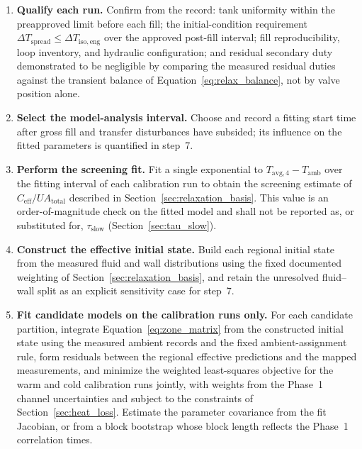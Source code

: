 \documentclass[11pt]{article}
\newcommand{\Tavg}{T_{\mathrm{avg},4}}
\newcommand{\Tamb}{T_{\mathrm{amb}}}
\begin{document}
\begin{enumerate}
    \item \textbf{Qualify each run.} Confirm from the record: tank uniformity within the preapproved limit before each fill; the initial-condition requirement $\Delta T_{\mathrm{spread}}\leq\Delta T_{\mathrm{iso,eng}}$ over the approved post-fill interval; fill reproducibility, loop inventory, and hydraulic configuration; and residual secondary duty demonstrated to be negligible by comparing the measured residual duties against the transient balance of Equation~\eqref{eq:relax_balance}, not by valve position alone.

    \item \textbf{Select the model-analysis interval.} Choose and record a fitting start time after gross fill and transfer disturbances have subsided; its influence on the fitted parameters is quantified in step~7.

    \item \textbf{Perform the screening fit.} Fit a single exponential to $\Tavg-\Tamb$ over the fitting interval of each calibration run to obtain the screening estimate of $C_{\mathrm{eff}}/UA_{\mathrm{total}}$ described in Section~\ref{sec:relaxation_basis}. This value is an order-of-magnitude check on the fitted model and shall not be reported as, or substituted for, $\tau_{\mathrm{slow}}$ (Section~\ref{sec:tau_slow}).

    \item \textbf{Construct the effective initial state.} Build each regional initial state from the measured fluid and wall distributions using the fixed documented weighting of Section~\ref{sec:relaxation_basis}, and retain the unresolved fluid--wall split as an explicit sensitivity case for step~7.

    \item \textbf{Fit candidate models on the calibration runs only.} For each candidate partition, integrate Equation~\eqref{eq:zone_matrix} from the constructed initial state using the measured ambient records and the fixed ambient-assignment rule, form residuals between the regional effective predictions and the mapped measurements, and minimize the weighted least-squares objective for the warm and cold calibration runs jointly, with weights from the Phase~1 channel uncertainties and subject to the constraints of Section~\ref{sec:heat_loss}. Estimate the parameter covariance from the fit Jacobian, or from a block bootstrap whose block length reflects the Phase~1 correlation times.


\end{enumerate}
\end{document}
